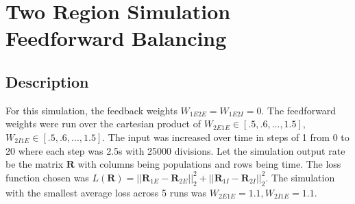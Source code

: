 \documentclass[10pt]{article}
\begin{document}
\section{Two Region Simulation Feedforward Balancing}
\subsection{Description}
For this simulation, the feedback weights $W_{1E2E}=W_{1E2I}=0$. The feedforward weights were run over the cartesian product of $W_{2E1E} \in [.5,.6,..., 1.5]$,$W_{2I1E} \in [.5, .6,...,1.5]$. The input was increased over time in steps of 1 from 0 to 20 where each step was 2.5s with 25000 divisions. Let the simulation output rate be the matrix $\boldsymbol R$ with columns being populations and rows being time. The loss function chosen was $L(\boldsymbol R) = ||\boldsymbol R_{1E} - \boldsymbol R_{2E} ||_2^2 + ||\boldsymbol R_{1I} -\boldsymbol R_{2I}||^2_2$. The simulation with the smallest average loss across 5 runs was $W_{2E1E} = 1.1, W_{2I1E} = 1.1$.
\end{document}
